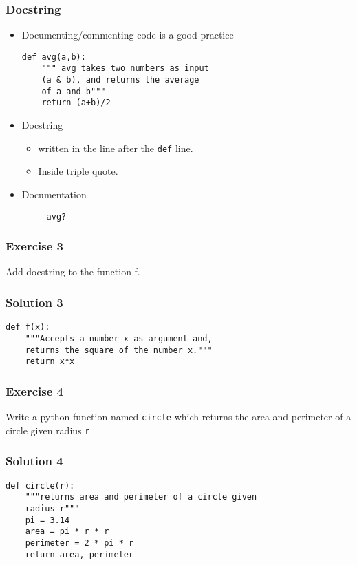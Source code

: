 \documentclass[presentation]{beamer}
\begin{document}
\begin{frame}[fragile]
\frametitle{Docstring}
\label{sec-10}


\begin{itemize}
\item Documenting/commenting code is a good practice
\begin{verbatim}
def avg(a,b):
    """ avg takes two numbers as input 
    (a & b), and returns the average 
    of a and b"""
    return (a+b)/2
\end{verbatim}
\item Docstring

\begin{itemize}
\item written in the line after the \texttt{def} line.
\item Inside triple quote.
\end{itemize}

\item Documentation
\begin{verbatim}
     avg?
\end{verbatim}

\end{itemize}
\end{frame}
\begin{frame}
\frametitle{Exercise 3}
\label{sec-11}

  Add docstring to the function f.
\end{frame}
\begin{frame}[fragile]
\frametitle{Solution 3}
\label{sec-12}


\begin{verbatim}
def f(x):
    """Accepts a number x as argument and,
    returns the square of the number x."""
    return x*x
\end{verbatim}
\end{frame}
\begin{frame}
\frametitle{Exercise 4}
\label{sec-13}

  Write a python function named \texttt{circle} which returns the area and
  perimeter of a circle given radius \texttt{r}.
\end{frame}
\begin{frame}[fragile]
\frametitle{Solution 4}
\label{sec-14}

\begin{verbatim}
def circle(r):
    """returns area and perimeter of a circle given 
    radius r"""
    pi = 3.14
    area = pi * r * r
    perimeter = 2 * pi * r
    return area, perimeter
\end{verbatim}
\end{frame}
\end{document}
